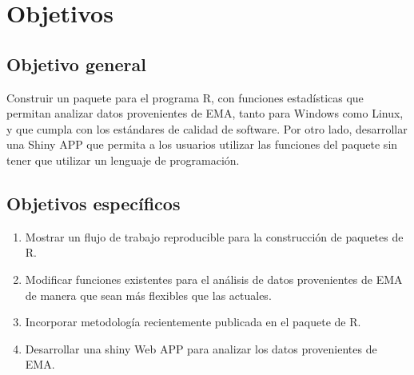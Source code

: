\chapter{Objetivos}
\section{Objetivo general}

Construir un paquete para el programa R, con funciones estadísticas que permitan analizar datos provenientes de EMA, tanto para Windows como Linux, y que cumpla con los estándares de calidad de software. Por otro lado, desarrollar una Shiny APP que permita a los usuarios utilizar las funciones del paquete sin tener que utilizar un lenguaje de programación.


\section{Objetivos específicos}
\begin{enumerate}
\item Mostrar un flujo de trabajo reproducible para la construcción de paquetes de R.
\item Modificar funciones existentes para el análisis de datos provenientes de EMA de manera que sean más flexibles que las actuales.
\item Incorporar metodología recientemente publicada en el paquete de R.
\item Desarrollar una shiny Web APP para analizar los datos provenientes de EMA.
\end{enumerate}
